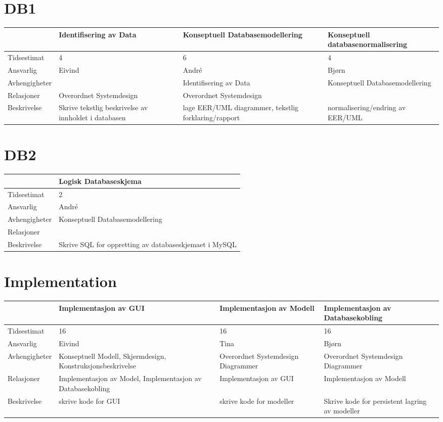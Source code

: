 \documentclass{article}
\begin{document}
\newpage

\section{DB1}

\begin{tabular}{|l|p{3cm}|p{3cm}|p{4cm}|}
\hline
& Identifisering av Data & Konseptuell Databasemodellering & Konseptuell
databasenormalisering \\ \hline
Tidsestimat & 4 & 6 & 4 \\ \hline
Ansvarlig & Eivind & Andr\'e & Bj\o rn \\ \hline
Avhengigheter &  & Identifisering av Data & Konseptuell Databasemodellering
\\ \hline
Relasjoner & Overordnet Systemdesign & Overordnet Systemdesign &  \\ \hline
Beskrivelse & Skrive tekstlig beskrivelse av innholdet i databasen & lage
EER/UML diagrammer, tekstlig forklaring/rapport & normalisering/endring av
EER/UML \\ \hline
\end{tabular}

\section{DB2}

\begin{tabular}{|l|p{3cm}|}
\hline
& Logisk Databaseskjema \\ \hline
Tidsestimat & 2 \\ \hline
Ansvarlig & Andr\'{e} \\ \hline
Avhengigheter & Konseptuell Databasemodellering \\ \hline
Relasjoner &  \\ \hline
Beskrivelse & Skrive SQL for oppretting av databaseskjemaet i MySQL \\ \hline
\end{tabular}

\newpage

\section{Implementation}

\begin{tabular}{|l|p{3cm}|p{3cm}|p{3cm}|}
\hline
& Implementasjon av GUI & Implementasjon av Modell & Implementasjon av
Databasekobling \\ \hline
Tidsestimat & 16 & 16 & 16 \\ \hline
Ansvarlig & Eivind & Tina & Bj\o rn \\ \hline
Avhengigheter & Konseptuell Modell, Skjermdesign, Konstruksjonsbeskrivelse & 
Overordnet Systemdesign Diagrammer & Overordnet Systemdesign Diagrammer \\ 
\hline
Relasjoner & Implementasjon av Model, Implementasjon av Databasekobling & 
Implementasjon av GUI & Implementasjon av Modell \\ \hline
Beskrivelse & skrive kode for GUI & skrive kode for modeller & Skrive kode
for persistent lagring av modeller \\ \hline
\end{tabular}
\end{document}
